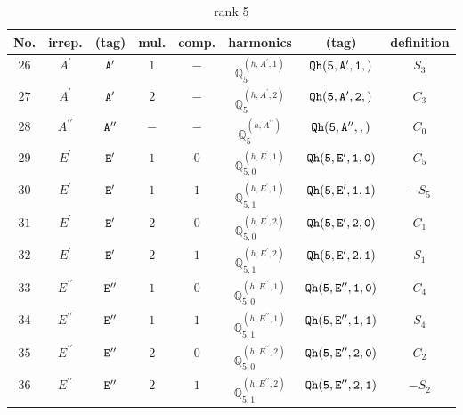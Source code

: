 \documentclass[fleqn,8pt]{jsarticle}
\begin{document}
\begin{table}[ht!]
\begin{center}
\caption{rank 5}
\renewcommand{\arraystretch}{1.3}
\begin{tabular}{cccccccc} \hline \hline
No. & irrep. & (tag) & mul. & comp. & harmonics & (tag) & definition \\ \hline
$ 26 $ & $ A^{\prime} $ & $ {\tt A'} $ & $ 1 $ & $ - $ & $ \mathbb{Q}_{5}^{(h,A^{\prime},1)} $ & $ {\tt Qh(5,A',1,)} $ & $ S_{3} $ \\
$ 27 $ & $ A^{\prime} $ & $ {\tt A'} $ & $ 2 $ & $ - $ & $ \mathbb{Q}_{5}^{(h,A^{\prime},2)} $ & $ {\tt Qh(5,A',2,)} $ & $ C_{3} $ \\
$ 28 $ & $ A^{\prime\prime} $ & $ {\tt A''} $ & $ - $ & $ - $ & $ \mathbb{Q}_{5}^{(h,A^{\prime\prime})} $ & $ {\tt Qh(5,A'',,)} $ & $ C_{0} $ \\
$ 29 $ & $ E^{\prime} $ & $ {\tt E'} $ & $ 1 $ & $ 0 $ & $ \mathbb{Q}_{5,0}^{(h,E^{\prime},1)} $ & $ {\tt Qh(5,E',1,0)} $ & $ C_{5} $ \\
$ 30 $ & $ E^{\prime} $ & $ {\tt E'} $ & $ 1 $ & $ 1 $ & $ \mathbb{Q}_{5,1}^{(h,E^{\prime},1)} $ & $ {\tt Qh(5,E',1,1)} $ & $ - S_{5} $ \\
$ 31 $ & $ E^{\prime} $ & $ {\tt E'} $ & $ 2 $ & $ 0 $ & $ \mathbb{Q}_{5,0}^{(h,E^{\prime},2)} $ & $ {\tt Qh(5,E',2,0)} $ & $ C_{1} $ \\
$ 32 $ & $ E^{\prime} $ & $ {\tt E'} $ & $ 2 $ & $ 1 $ & $ \mathbb{Q}_{5,1}^{(h,E^{\prime},2)} $ & $ {\tt Qh(5,E',2,1)} $ & $ S_{1} $ \\
$ 33 $ & $ E^{\prime\prime} $ & $ {\tt E''} $ & $ 1 $ & $ 0 $ & $ \mathbb{Q}_{5,0}^{(h,E^{\prime\prime},1)} $ & $ {\tt Qh(5,E'',1,0)} $ & $ C_{4} $ \\
$ 34 $ & $ E^{\prime\prime} $ & $ {\tt E''} $ & $ 1 $ & $ 1 $ & $ \mathbb{Q}_{5,1}^{(h,E^{\prime\prime},1)} $ & $ {\tt Qh(5,E'',1,1)} $ & $ S_{4} $ \\
$ 35 $ & $ E^{\prime\prime} $ & $ {\tt E''} $ & $ 2 $ & $ 0 $ & $ \mathbb{Q}_{5,0}^{(h,E^{\prime\prime},2)} $ & $ {\tt Qh(5,E'',2,0)} $ & $ C_{2} $ \\
$ 36 $ & $ E^{\prime\prime} $ & $ {\tt E''} $ & $ 2 $ & $ 1 $ & $ \mathbb{Q}_{5,1}^{(h,E^{\prime\prime},2)} $ & $ {\tt Qh(5,E'',2,1)} $ & $ - S_{2} $ \\
 \hline \hline
\end{tabular}
\end{center}
\end{table}
\end{document}
